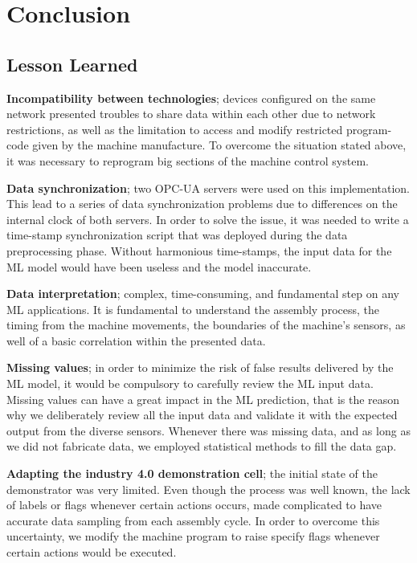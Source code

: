 \documentclass[5p,times,procedia]{elsarticle}
\begin{document}
\section{Conclusion}

\subsection{Lesson Learned} %

\textbf{Incompatibility between technologies}; devices configured on the same network presented troubles to share data within each other due to network restrictions, as well as the limitation to access and modify restricted program-code given by the machine manufacture. 
To overcome the situation stated above, it was necessary to reprogram big sections of the machine control system.

\textbf{Data synchronization}; two OPC-UA servers were used on this implementation. This lead to a series of data synchronization problems due to differences on the internal clock of both servers.
In order to solve the issue, it was needed to write a time-stamp synchronization script that was deployed during the data preprocessing phase. Without harmonious time-stamps, the input data for the ML model would have been useless and the model inaccurate. 

\textbf{Data interpretation}; complex, time-consuming, and fundamental step on any ML applications. It is fundamental to understand the assembly process, the timing from the machine movements, the boundaries of the machine's sensors, as well of a basic correlation within the presented data.

\textbf{Missing values}; in order to minimize the risk of false results delivered by the ML model, it would be compulsory to carefully review the ML input data. Missing values can have a great impact in the ML prediction, that is the reason why we deliberately review all the input data and validate it with the expected output from the diverse sensors. Whenever there was missing data, and as long as we did not fabricate data, we employed statistical methods to fill the data gap.

\textbf{Adapting the industry 4.0 demonstration cell}; the initial state of the demonstrator was very limited. Even though the process was well known, the lack of labels or flags whenever certain actions occurs, made complicated to have accurate data sampling from each assembly cycle. In order to overcome this uncertainty, we modify the machine program to raise specify flags whenever certain actions would be executed.
\end{document}
